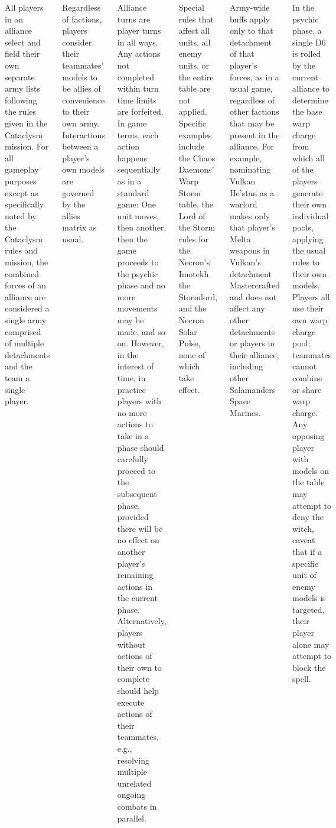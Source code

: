 \begin{columns}
  All players in an alliance select and
field their own separate army lists following the rules given in the
Cataclysm mission.  For all gameplay purposes except as specifically
noted by the Cataclysm rules and mission, the combined forces of an
alliance are considered a single army comprised of multiple
detachments and the team a single player.

  Regardless of factions, players consider
their teammates' models to be allies of convenience to their own army.
Interactions between a player's own models are governed by the allies
matrix as usual.

  Alliance turns are player turns in all
ways.  Any actions not completed within turn time limits are
forfeited.  In game terms, each action happens sequentially as in a
standard game: One unit moves, then another, then the game proceeds to
the psychic phase and no more movements may be made, and so on.
However, in the interest of time, in practice players with no more
actions to take in a phase should carefully proceed to the subsequent
phase, provided there will be no effect on another player's remaining
actions in the current phase.  Alternatively, players without actions
of their own to complete should help execute actions of their
teammates, e.g., resolving multiple unrelated ongoing combats in
parallel.

  Special rules that affect all
units, all enemy units, or the entire table are not applied.  Specific
examples include the Chaos Daemons' Warp Storm table, the Lord of the
Storm rules for the Necron's Imotekh the Stormlord, and the Necron
Solar Pulse, none of which take effect.

Army-wide buffs apply only to that detachment of that player's forces,
as in a usual game, regardless of other factions that may be present
in the alliance.  For example, nominating Vulkan He'stan as a warlord
makes only that player's Melta weapons in Vulkan's detachment
Mastercrafted and does not affect any other detachments or players in
their alliance, including other Salamanders Space Marines.

  In the psychic phase, a single D6
is rolled by the current alliance to determine the base warp charge
from which all of the players generate their own individual pools,
applying the usual rules to their own models.  Players all use their
own warp charge pool; teammates cannot combine or share warp charge.
Any opposing player with models on the table may attempt to deny the
witch, caveat that if a specific unit of enemy models is targeted,
their player alone may attempt to block the spell.


\end{columns}
